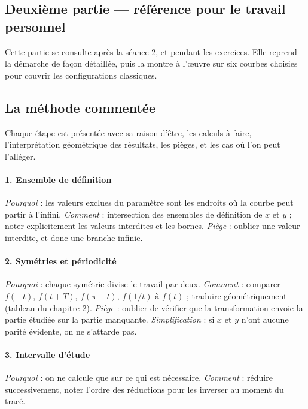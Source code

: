 \documentclass[a4paper,11pt]{article}
\numberwithin{equation}{section}
\numberwithin{figure}{section}
\numberwithin{table}{section}
\theoremstyle{enonce}
\theoremstyle{exemple}
\theoremstyle{remarque}
\begin{document}
\clearpage
\subsection*{Deuxième partie --- référence pour le travail personnel}

Cette partie se consulte après la séance 2, et pendant les exercices. Elle reprend la démarche de façon détaillée, puis
la montre à l'œuvre sur six courbes choisies pour couvrir les configurations classiques.

\subsection{La méthode commentée}\label{sec:methode-commentee}

Chaque étape est présentée avec sa raison d'être, les calculs à faire, l'interprétation géométrique des résultats, les
pièges, et les cas où l'on peut l'alléger.

\paragraph{1. Ensemble de définition}
\emph{Pourquoi} : les valeurs exclues du paramètre sont les endroits où la courbe peut partir à l'infini.
\emph{Comment} : intersection des ensembles de définition de $x$ et $y$ ; noter explicitement les valeurs interdites et les
bornes. \emph{Piège} : oublier une valeur interdite, et donc une branche infinie.

\paragraph{2. Symétries et périodicité}
\emph{Pourquoi} : chaque symétrie divise le travail par deux. \emph{Comment} : comparer $f(-t)$, $f(t+T)$, $f(\pi-t)$,
$f(1/t)$ à $f(t)$ ; traduire géométriquement (tableau du chapitre 2). \emph{Piège} : oublier de vérifier que la
transformation envoie la partie étudiée sur la partie manquante. \emph{Simplification} : si $x$ et $y$ n'ont aucune parité
évidente, on ne s'attarde pas.

\paragraph{3. Intervalle d'étude}
\emph{Pourquoi} : on ne calcule que sur ce qui est nécessaire. \emph{Comment} : réduire successivement, noter l'ordre des
réductions pour les inverser au moment du tracé.
\end{document}
